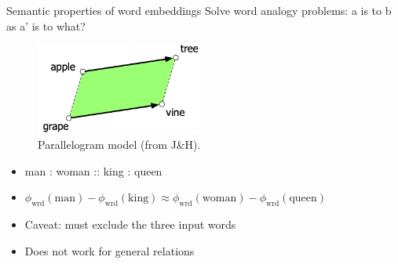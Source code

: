\documentclass[usenames,dvipsnames,notes,11pt,aspectratio=169]{beamer}
\newcommand{\pdfnote}[1]{}
\begin{document}
\begin{frame}
    {Semantic properties of word embeddings}
        Solve word analogy problems: a is to b as a' is to what?
        \vspace{-1em}
        \begin{figure}
            \includegraphics[height=3cm]{figures/analogy}
            \caption{Parallelogram model (from J\&H).}
        \end{figure}
        \vspace{-1em}
            \begin{itemize}
                \item man : woman :: king : queen
                \item[] $\phi_{\text{wrd}}(\text{man}) - \phi_{\text{wrd}}(\text{king}) \approx \phi_{\text{wrd}}(\text{woman}) - \phi_{\text{wrd}}(\text{queen})$
                \item Caveat: must exclude the three input words
                \item Does not work for general relations
            \end{itemize}
            \pdfnote{
                While embedding spaces perform well if the task involves frequent words, small distances, and certain relations (like relating countries with their capitals or verbs/nouns with their inflected forms), the parallelogram method with embeddings doesn’t work as well for other relations
            }
\end{frame}
\end{document}

